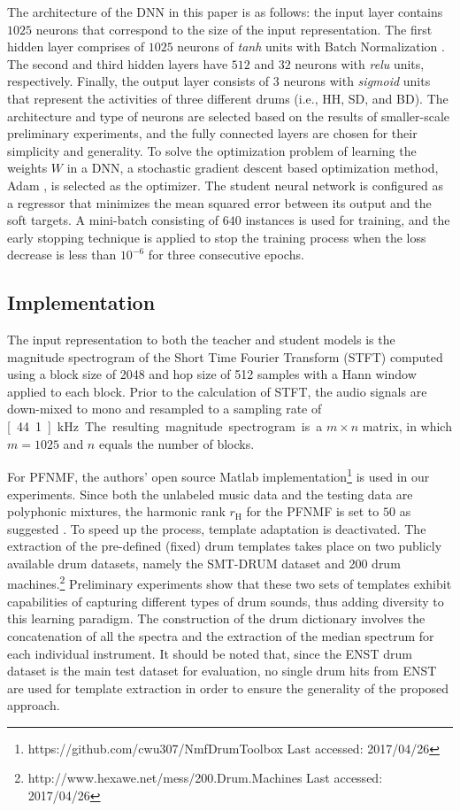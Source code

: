 \documentclass{article}
\begin{document}
The architecture of the DNN in this paper is as follows: the input layer contains $1025$ neurons that correspond to the size of the input representation. The first hidden layer comprises of $1025$ neurons of \textit{tanh} units with Batch Normalization \cite{Ioffe2015}. The second and third hidden layers have $512$ and $32$ neurons with \textit{relu} units, respectively. Finally, the output layer consists of 3 neurons with \textit{sigmoid} units that represent the activities of three different drums (i.e., HH, SD, and BD). The architecture and type of neurons are selected based on the results of smaller-scale preliminary experiments, and the fully connected layers are chosen for their simplicity and generality. To solve the optimization problem of learning the weights $W$ in a DNN, a stochastic gradient descent based optimization method, Adam \cite{Kingma2015}, is selected as the optimizer. The student neural network is configured as a regressor that minimizes the mean squared error between its output and the soft targets. A mini-batch consisting of $640$ instances is used for training, and the early stopping technique is applied to stop the training process when the loss decrease is less than $10^{-6}$ for three consecutive epochs. 

\subsection{Implementation}
The input representation to both the teacher and student models is the magnitude spectrogram of the Short Time Fourier Transform (STFT) computed using a block size of 2048 and hop size of 512 samples with a Hann window applied to each block. Prior to the calculation of STFT, the audio signals are down-mixed to mono and resampled to a sampling rate of \unit[44.1]{kHz}. The resulting magnitude spectrogram is a $m \times n$ matrix, in which $m = 1025$ and $n$ equals the number of blocks. 

For PFNMF, the authors' open source Matlab implementation\footnote{https://github.com/cwu307/NmfDrumToolbox Last accessed: 2017/04/26} is used in our experiments. Since both the unlabeled music data and the testing data are polyphonic mixtures, the harmonic rank $r_\mathrm{H} $ for the PFNMF is set to $50$ as suggested \cite{Wu2015a}. To speed up the process, template adaptation is deactivated. The extraction of the pre-defined (fixed) drum templates takes place on two publicly available drum datasets, namely the SMT-DRUM dataset \cite{Dittmar2014} and 200 drum machines.\footnote{http://www.hexawe.net/mess/200.Drum.Machines Last accessed: 2017/04/26} Preliminary experiments show that these two sets of templates exhibit capabilities of capturing different types of drum sounds, thus adding diversity to this learning paradigm. The construction of the drum dictionary involves the concatenation of all the spectra and the extraction of the median spectrum for each individual instrument. It should be noted that, since the ENST drum dataset is the main test dataset for evaluation, no single drum hits from ENST are used for template extraction in order to ensure the generality of the proposed approach.
\end{document}
